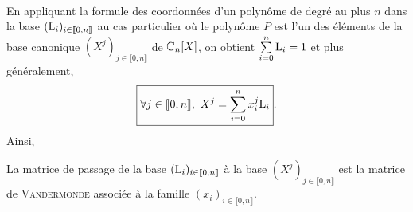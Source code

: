 \cite{maths-france} \\
En appliquant la formule des coordonnées d'un polynôme de degré au plus $n$ dans la base $(\mathrm{L}_i)_{i \in \llbracket 0, n \rrbracket}$ au cas particulier où le polynôme $P$ est l'un des éléments de la base canonique $(X^j)_{j \in \llbracket 0, n \rrbracket}$ de $\mathbb{C}_n[X]$, on obtient $\sum\limits_{i=0}^{n} \mathrm{L}_i = 1$ et plus généralement, 
$$\boxed{\forall j \in \llbracket 0, n \rrbracket,\ X^j = \sum_{i=0}^{n} x_i ^j \mathrm{L}_i}.$$
Ainsi, 
\begin{prop}
    La matrice de passage de la base  $(\mathrm{L}_i)_{i \in \llbracket 0, n \rrbracket}$ à la base  $(X^j)_{j \in \llbracket 0, n \rrbracket}$ est la matrice de \textsc{Vandermonde} associée à la famille $(x_i)_{i \in \llbracket 0, n \rrbracket}$.
\end{prop}
